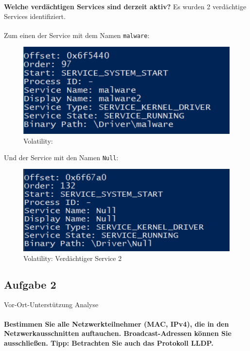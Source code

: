 \documentclass[
    a4paper,
    pagesize,
	pdftex,
    12pt,
]{scrartcl}
\begin{document}
\textbf{Welche verdächtigen Services sind derzeit aktiv?}
Es wurden 2 verdächtige Services identifiziert.
\\ \\
Zum einen der Service mit dem Namen \lstinline[breaklines]|malware|:
\begin{figure}[H]
	\centering
	\includegraphics[width=13cm]{vol-sus-service1.png}
	\caption{Volatility: }
	\label{fig:vol-sus-service1}
\end{figure} 
Und der Service mit den Namen \lstinline[breaklines]|Null|:
\begin{figure}[H]
	\centering
	\includegraphics[width=13cm]{vol-sus-service2.png}
	\caption{Volatility: Verdächtiger Service 2}
	\label{fig:vol-sus-service2.png}
\end{figure} 

\subsection{Aufgabe 2}
Vor-Ort-Unterstützung Analyse
\\ \\
\textbf{Bestimmen Sie alle Netzwerkteilnehmer (MAC, IPv4), die in den Netzwerkausschnitten auftauchen. Broadcast-Adressen können Sie ausschließen. Tipp: Betrachten Sie auch das Protokoll LLDP.}
\end{document}
